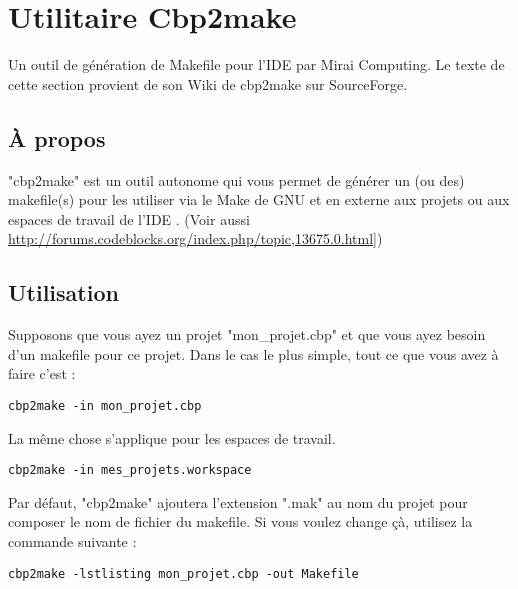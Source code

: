 ﻿\section{Utilitaire Cbp2make}\label{sec:cbp2make}

Un outil de génération de Makefile pour l'IDE \codeblocks par Mirai Computing. Le texte de cette section provient de son Wiki de cbp2make sur SourceForge.

\subsection{À propos}

"cbp2make" est un outil autonome qui vous permet de générer un (ou des) makefile(s) pour les utiliser via le Make de GNU et en externe aux projets ou aux espaces de travail de l'IDE \codeblocks. (Voir aussi \url{http://forums.codeblocks.org/index.php/topic,13675.0.html]})

\subsection{Utilisation}

Supposons que vous ayez un projet "mon\_projet.cbp" et que vous ayez besoin d'un makefile pour ce projet. Dans le cas le plus simple, tout ce que vous avez à faire c'est :
\begin{lstlisting}
cbp2make -in mon_projet.cbp
\end{lstlisting}

La même chose s'applique pour les espaces de travail.
\begin{lstlisting}
cbp2make -in mes_projets.workspace
\end{lstlisting}

Par défaut, "cbp2make" ajoutera l'extension ".mak" au nom du projet pour composer le nom de fichier du makefile.
Si vous voulez change çà, utilisez la commande suivante :

\begin{lstlisting}
cbp2make -lstlisting mon_projet.cbp -out Makefile
\end{lstlisting}

